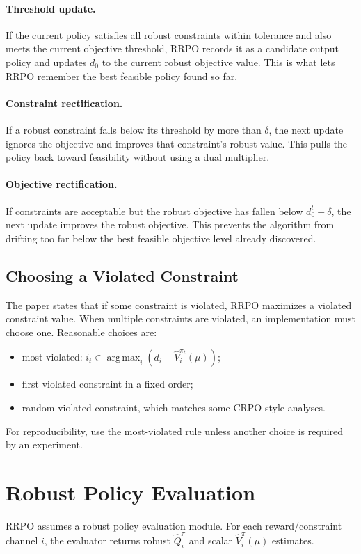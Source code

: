 \documentclass[11pt]{article}
\newcommand{\argmax}{\operatorname*{arg\,max}}
\newcommand{\1}{\mathbf 1}
\begin{document}
\paragraph{Threshold update.}
If the current policy satisfies all robust constraints within tolerance and also meets the current objective threshold, RRPO records it as a candidate output policy and updates $d_0$ to the current robust objective value.  This is what lets RRPO remember the best feasible policy found so far.

\paragraph{Constraint rectification.}
If a robust constraint falls below its threshold by more than $\delta$, the next update ignores the objective and improves that constraint's robust value.  This pulls the policy back toward feasibility without using a dual multiplier.

\paragraph{Objective rectification.}
If constraints are acceptable but the robust objective has fallen below $d_0^t-\delta$, the next update improves the robust objective.  This prevents the algorithm from drifting too far below the best feasible objective level already discovered.

\subsection{Choosing a Violated Constraint}
The paper states that if some constraint is violated, RRPO maximizes a violated constraint value.  When multiple constraints are violated, an implementation must choose one.  Reasonable choices are:
\begin{itemize}[leftmargin=2em]
    \item most violated: $i_t\in\argmax_i(d_i-\widehat V_i^{\pi_t}(\mu))$;
    \item first violated constraint in a fixed order;
    \item random violated constraint, which matches some CRPO-style analyses.
\end{itemize}
For reproducibility, use the most-violated rule unless another choice is required by an experiment.

\section{Robust Policy Evaluation}
RRPO assumes a robust policy evaluation module.  For each reward/constraint channel $i$, the evaluator returns robust $\widehat Q_i^\pi$ and scalar $\widehat V_i^\pi(\mu)$ estimates.
\end{document}
